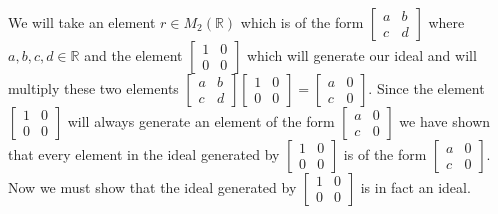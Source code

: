 \documentclass{article}
\begin{document}
      \paragraph{} We will take an element $r \in M_2(\mathbb{R})$ which is of the form $\begin{bmatrix}a & b \\ c & d \end{bmatrix}$ where $a,b,c,d \in \mathbb{R}$ and the element $\begin{bmatrix}1 & 0 \\ 0 & 0 \end{bmatrix}$ which will generate our ideal and will multiply these two elements $\begin{bmatrix}a & b \\ c & d \end{bmatrix}\begin{bmatrix}1 & 0 \\ 0 & 0 \end{bmatrix} = \begin{bmatrix}a & 0 \\ c & 0 \end{bmatrix}$. Since the element $\begin{bmatrix}1 & 0 \\ 0 & 0 \end{bmatrix}$ will always generate an element of the form $\begin{bmatrix}a & 0 \\ c & 0 \end{bmatrix}$ we have shown that every element in the ideal generated by $\begin{bmatrix}1 & 0 \\ 0 & 0 \end{bmatrix}$ is of the form $\begin{bmatrix}a & 0 \\ c & 0 \end{bmatrix}$. Now we must show that the ideal generated by $\begin{bmatrix}1 & 0 \\ 0 & 0 \end{bmatrix}$ is in fact an ideal.
\end{document}
